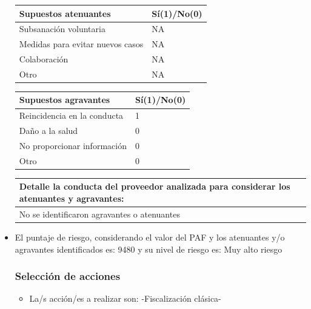 \documentclass[
  11pt,
  a4paper,
  oneside]{article}
\providecommand{\tightlist}{%
  \setlength{\itemsep}{0pt}\setlength{\parskip}{0pt}}
\begin{document}
\begin{itemize}
  \begin{table}
  \setlength\extrarowheight{3pt}
  \begin{tabular}{| M{7.5cm} | M{7.5cm} |}
  \hline
  \textbf{Supuestos atenuantes} & \textbf{Sí(1)/No(0)} \\ [10pt]
  \hline
  \hline
   Subsanación voluntaria & NA\\ [10pt]
  \hline
   Medidas para evitar nuevos casos & NA\\ [10pt]
  \hline
   Colaboración & NA\\ [10pt]
  \hline
   Otro & NA\\ [10pt]
  \hline
  \end{tabular}
  \end{table}
  \setlength{\arrayrulewidth}{0.35mm}
  \begin{table}
  \setlength\extrarowheight{3pt}
  \begin{tabular}{| M{7.5cm} | M{7.5cm} |}
  \hline
  \textbf{Supuestos agravantes} & \textbf{Sí(1)/No(0)} \\ [10pt]
  \hline
  \hline
   Reincidencia en la conducta & 1\\ [10pt]
  \hline
   Daño a la salud & 0\\ [10pt]
  \hline
   No proporcionar información & 0\\ [10pt]
  \hline
   Otro & 0\\ [10pt]
  \hline
  \end{tabular}
  \end{table}
  \setlength{\arrayrulewidth}{0.35mm}
  \begin{table}
  \setlength\extrarowheight{3pt}
  \begin{tabular}{| M{15cm} |}
  \hline
  \textbf{Detalle la conducta del proveedor analizada para considerar los atenuantes y agravantes:} \\ [10pt]
  \hline
  \hline
   No se identificaron agravantes o atenuantes\\ [10pt]
  \hline
  \end{tabular}
  \end{table}
\item
  El puntaje de riesgo, considerando el valor del PAF y los atenuantes
  y/o agravantes identificados es: 9480 y su nivel de riesgo es: Muy
  alto riesgo

  \subsubsection{Selección de acciones}

  \begin{itemize}
  \tightlist
  \item
    La/s acción/es a realizar son: -Fiscalización clásica-
  \end{itemize}
\end{itemize}
\end{document}
